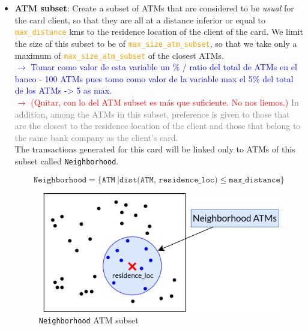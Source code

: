 \documentclass{article}
\begin{document}
\begin{itemize}
    \item \textbf{ATM subset}: Create a subset of ATMs that are considered to be \textit{usual} for 
    the card client, so that they are all at a distance inferior or equal to 
    \textcolor{orange}{\texttt{max\_distance}} kms to the residence location of the client 
    of the card. We limit the size of this subset to be of \textcolor{orange}{\texttt{max\_size\_atm\_subset}}, so that we take only a maximum of \textcolor{orange}{\texttt{max\_size\_atm\_subset}} of the closest ATMs.\\
    \textcolor{blue}{$\rightarrow$ Tomar como valor de esta variable un \% / ratio del total de ATMs en el banco - 100 ATMs pues tomo como valor de la variable max el 5\% del total de los ATMs -> 5 as max.}\\
    \textcolor{red}{$\rightarrow$ (Quitar, con lo del ATM subset es más que suficiente. No nos liemos.)} \textcolor{gray}{In addition, among the ATMs in this subset, preference is given to 
    those that are the closest to the residence location of the client and those that 
    belong to the same bank company as the client's card.\\}
    The transactions generated for this card will be linked only to ATMs of this subset called 
    \texttt{Neighborhood}.

    $$\texttt{Neighborhood} = \{\texttt{ATM}\ | \texttt{dist(ATM, residence\_loc)} \leq \texttt{max\_distance}\}$$

    \begin{figure}[H]
      \centering
      \includegraphics[scale=1.1]{images/tx-generation-1-named.png}
      \caption{\texttt{Neighborhood} ATM subset}
    \end{figure}


\end{itemize}
\end{document}
